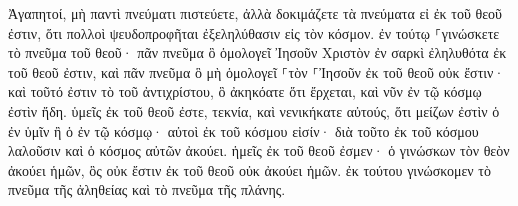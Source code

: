 \documentclass{openreader}
\begin{document}
Ἀγαπητοί, μὴ παντὶ πνεύματι πιστεύετε, ἀλλὰ δοκιμάζετε τὰ πνεύματα εἰ ἐκ τοῦ θεοῦ ἐστιν, ὅτι πολλοὶ ψευδοπροφῆται ἐξεληλύθασιν εἰς τὸν κόσμον. ἐν τούτῳ ⸀γινώσκετε τὸ πνεῦμα τοῦ θεοῦ· πᾶν πνεῦμα ὃ ὁμολογεῖ Ἰησοῦν Χριστὸν ἐν σαρκὶ ἐληλυθότα ἐκ τοῦ θεοῦ ἐστιν, καὶ πᾶν πνεῦμα ὃ μὴ ὁμολογεῖ ⸀τὸν ⸀Ἰησοῦν ἐκ τοῦ θεοῦ οὐκ ἔστιν· καὶ τοῦτό ἐστιν τὸ τοῦ ἀντιχρίστου, ὃ ἀκηκόατε ὅτι ἔρχεται, καὶ νῦν ἐν τῷ κόσμῳ ἐστὶν ἤδη. ὑμεῖς ἐκ τοῦ θεοῦ ἐστε, τεκνία, καὶ νενικήκατε αὐτούς, ὅτι μείζων ἐστὶν ὁ ἐν ὑμῖν ἢ ὁ ἐν τῷ κόσμῳ· αὐτοὶ ἐκ τοῦ κόσμου εἰσίν· διὰ τοῦτο ἐκ τοῦ κόσμου λαλοῦσιν καὶ ὁ κόσμος αὐτῶν ἀκούει. ἡμεῖς ἐκ τοῦ θεοῦ ἐσμεν· ὁ γινώσκων τὸν θεὸν ἀκούει ἡμῶν, ὃς οὐκ ἔστιν ἐκ τοῦ θεοῦ οὐκ ἀκούει ἡμῶν. ἐκ τούτου γινώσκομεν τὸ πνεῦμα τῆς ἀληθείας καὶ τὸ πνεῦμα τῆς πλάνης. 
\end{document}
